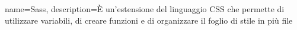 {
	name={Sass},
	description={È un'estensione del linguaggio CSS che permette di utilizzare variabili, di creare funzioni e di organizzare il foglio di stile in più file}
}